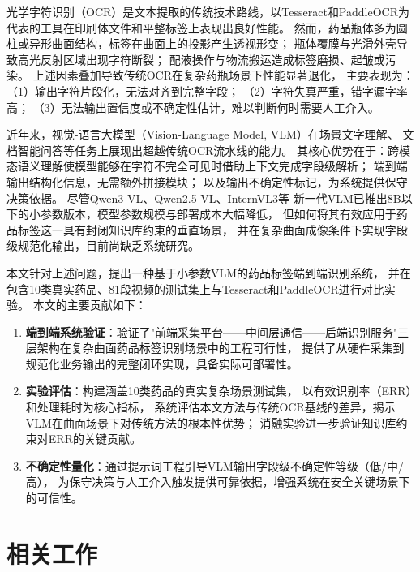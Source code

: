 \documentclass[12pt, a4paper]{article}
\begin{document}
光学字符识别（OCR）是文本提取的传统技术路线，以Tesseract\cite{ref:tesseract}和PaddleOCR\cite{ref:paddleocr}为代表的工具在印刷体文件和平整标签上表现出良好性能。
然而，药品瓶体多为圆柱或异形曲面结构，标签在曲面上的投影产生透视形变；
瓶体覆膜与光滑外壳导致高光反射区域出现字符断裂；
配液操作与物流搬运造成标签磨损、起皱或污染。
上述因素叠加导致传统OCR在复杂药瓶场景下性能显著退化，
主要表现为：（1）输出字符片段化，无法对齐到完整字段；
（2）字符失真严重，错字漏字率高；
（3）无法输出置信度或不确定性估计，难以判断何时需要人工介入。

近年来，视觉-语言大模型（Vision-Language Model, VLM）在场景文字理解\cite{ref:gotocr}、
文档智能问答\cite{ref:qwen25vl}等任务上展现出超越传统OCR流水线的能力。
其核心优势在于：跨模态语义理解使模型能够在字符不完全可见时借助上下文完成字段级解析；
端到端输出结构化信息，无需额外拼接模块；
以及输出不确定性标记，为系统提供保守决策依据。
尽管Qwen3-VL\cite{ref:qwen3vl}、Qwen2.5-VL\cite{ref:qwen25vl}、InternVL3\cite{ref:internvl3}等
新一代VLM已推出8B以下的小参数版本，模型参数规模与部署成本大幅降低，
但如何将其有效应用于药品标签这一具有封闭知识库约束的垂直场景，
并在复杂曲面成像条件下实现字段级规范化输出，目前尚缺乏系统研究。

本文针对上述问题，提出一种基于小参数VLM的药品标签端到端识别系统，
并在包含10类真实药品、81段视频的测试集上与Tesseract和PaddleOCR进行对比实验。
本文的主要贡献如下：
\begin{enumerate}[leftmargin=2em]
  \item \textbf{端到端系统验证}：验证了"前端采集平台——中间层通信——后端识别服务"三层架构在复杂曲面药品标签识别场景中的工程可行性，
        提供了从硬件采集到规范化业务输出的完整闭环实现，具备实际可部署性。
  \item \textbf{实验评估}：构建涵盖10类药品的真实复杂场景测试集，
        以有效识别率（ERR）和处理耗时为核心指标，
        系统评估本文方法与传统OCR基线的差异，揭示VLM在曲面场景下对传统方法的根本性优势；
        消融实验进一步验证知识库约束对ERR的关键贡献。
  \item \textbf{不确定性量化}：通过提示词工程引导VLM输出字段级不确定性等级（低/中/高），
        为保守决策与人工介入触发提供可靠依据，增强系统在安全关键场景下的可信性。
\end{enumerate}


\section{相关工作}
\label{sec:related}
\end{document}
